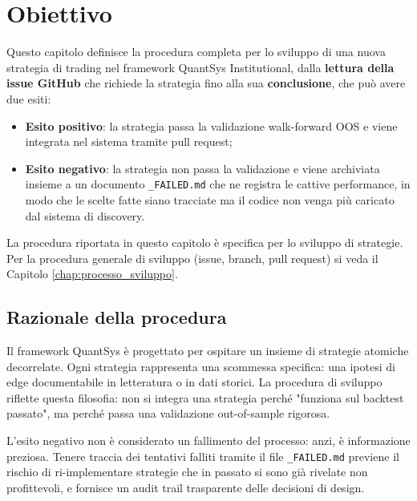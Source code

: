 \section{Obiettivo}

Questo capitolo definisce la procedura completa per lo sviluppo di una nuova strategia di trading nel framework QuantSys Institutional, dalla \textbf{lettura della issue GitHub} che richiede la strategia fino alla sua \textbf{conclusione}, che può avere due esiti:

\begin{itemize}
  \item \textbf{Esito positivo}: la strategia passa la validazione walk-forward OOS e viene integrata nel sistema tramite pull request;
  \item \textbf{Esito negativo}: la strategia non passa la validazione e viene archiviata insieme a un documento \texttt{\_FAILED.md} che ne registra le cattive performance, in modo che le scelte fatte siano tracciate ma il codice non venga più caricato dal sistema di discovery.
\end{itemize}

La procedura riportata in questo capitolo è specifica per lo sviluppo di strategie. Per la procedura generale di sviluppo (issue, branch, pull request) si veda il Capitolo \ref{chap:processo_sviluppo}.

\subsection{Razionale della procedura}

Il framework QuantSys è progettato per ospitare un insieme di strategie atomiche decorrelate. Ogni strategia rappresenta una scommessa specifica: una ipotesi di edge documentabile in letteratura o in dati storici. La procedura di sviluppo riflette questa filosofia: non si integra una strategia perché "funziona sul backtest passato", ma perché passa una validazione out-of-sample rigorosa.

L'esito negativo non è considerato un fallimento del processo: anzi, è informazione preziosa. Tenere traccia dei tentativi falliti tramite il file \texttt{\_FAILED.md} previene il rischio di ri-implementare strategie che in passato si sono già rivelate non profittevoli, e fornisce un audit trail trasparente delle decisioni di design.
